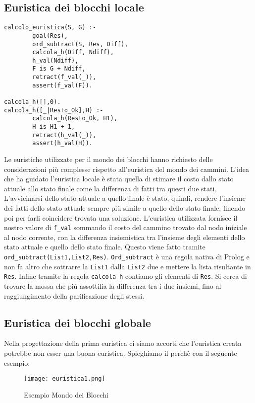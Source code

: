\subsection{Euristica dei blocchi locale}
\begin{lstlisting}
calcolo_euristica(S, G) :-
        goal(Res),
        ord_subtract(S, Res, Diff),
        calcola_h(Diff, Ndiff),
        h_val(Ndiff),
        F is G + Ndiff,
        retract(f_val(_)),
        assert(f_val(F)).

calcola_h([],0).
calcola_h([_|Resto_Ok],H) :-
        calcola_h(Resto_Ok, H1),
        H is H1 + 1,
        retract(h_val(_)),
        assert(h_val(H)).
\end{lstlisting}

Le euristiche utilizzate per il mondo dei blocchi hanno richiesto delle considerazioni più complesse rispetto all'euristica del mondo dei cammini. L'idea che ha guidato l'euristica locale è stata quella di stimare il costo dallo stato attuale allo stato finale come la differenza di fatti tra questi due stati. L'avvicinarsi dello stato attuale a quello finale è stato, quindi, rendere l'insieme dei fatti dello stato attuale sempre più simile a quello dello stato finale, finendo poi per farli coincidere trovata una soluzione.
L'euristica utilizzata fornisce il nostro valore di \lstinline{f_val} sommando il costo del cammino trovato dal nodo iniziale al nodo corrente, con la differenza insiemistica tra l'insieme degli elementi dello stato attuale e quello dello stato finale. Questo viene fatto tramite \lstinline{ord_subtract(List1,List2,Res)}. \lstinline{Ord_subtract} è una regola nativa di Prolog e non fa altro che sottrarre la \lstinline{List1} dalla \lstinline{List2} due e mettere la lista risultante in \lstinline{Res}. Infine tramite la regola \lstinline{calcola_h} contiamo gli elementi di \lstinline{Res}. Si cerca di trovare la mossa che più assottilia la differenza tra i due insiemi, fino al raggiungimento della parificazione degli stessi.
\newpage

\subsection{Euristica dei blocchi globale}
Nella progettazione della prima euristica ci siamo accorti che l'euristica creata potrebbe non esser una buona euristica. Spieghiamo il perchè con il seguente esempio:

\begin{figure}[!ht]
  \centering
  \texttt{[image: euristica1.png]}
  \caption{Esempio Mondo dei Blocchi}
  \label{fig:euristica1}
\end{figure}

